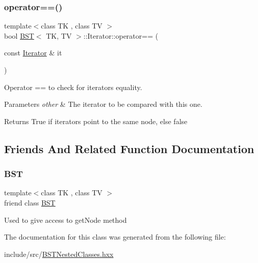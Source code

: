 \subsubsection{\texorpdfstring{operator==()}{operator==()}}
{\footnotesize\ttfamily template$<$class TK , class TV $>$ \\
bool \hyperlink{classBST}{B\+ST}$<$ TK, TV $>$\+::Iterator\+::operator== (\begin{DoxyParamCaption}\item[{const \hyperlink{classBST_1_1Iterator}{Iterator} \&}]{it }\end{DoxyParamCaption})\hspace{0.3cm}{\ttfamily [inline]}}



Operator == to check for iterators equality. 


\begin{DoxyParams}{Parameters}
{\em other} & The iterator to be compared with this one. \\
\hline
\end{DoxyParams}
\begin{DoxyReturn}{Returns}
True if iterators point to the same node, else false 
\end{DoxyReturn}


\subsection{Friends And Related Function Documentation}
\mbox{\label{classBST_1_1Iterator_abf74961fd25e946e53e07f358b4bb19a}} 
\subsubsection{\texorpdfstring{B\+ST}{BST}}
{\footnotesize\ttfamily template$<$class TK , class TV $>$ \\
friend class \hyperlink{classBST}{B\+ST}\hspace{0.3cm}{\ttfamily [friend]}}

Used to give access to get\+Node method 

The documentation for this class was generated from the following file\+:\begin{DoxyCompactItemize}
\item 
include/src/\hyperlink{BSTNestedClasses_8hxx}{B\+S\+T\+Nested\+Classes.\+hxx}\end{DoxyCompactItemize}
